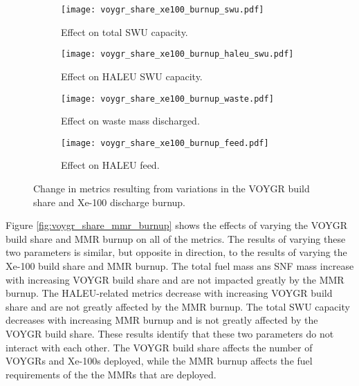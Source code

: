\begin{figure}
    \ContinuedFloat    
    \begin{subfigure}[t]{0.48\textwidth}
        \centering
        \texttt{[image: voygr\_share\_xe100\_burnup\_swu.pdf]}
        \caption{Effect on total SWU capacity.}
        \label{fig:voygr_share_xe100_burnup_swu}
    \end{subfigure}
    \hfill
    \begin{subfigure}[t]{0.48\textwidth}
        \centering
        \texttt{[image: voygr\_share\_xe100\_burnup\_haleu\_swu.pdf]}
        \caption{Effect on HALEU SWU capacity.}
        \label{fig:voygr_share_xe100_burnup_haleu_swu}
    \end{subfigure}
    
    \begin{subfigure}[t]{0.48\textwidth}
        \centering
        \texttt{[image: voygr\_share\_xe100\_burnup\_waste.pdf]}
        \caption{Effect on waste mass discharged.}
        \label{fig:voygr_share_xe100_burnup_waste}
    \end{subfigure}
    \hfill
    \begin{subfigure}[t]{0.48\textwidth}
        \centering
        \texttt{[image: voygr\_share\_xe100\_burnup\_feed.pdf]}
        \caption{Effect on HALEU feed.}
        \label{fig:voygr_share_xe100_burnup_feed}
    \end{subfigure}
    \caption{Change in metrics resulting from variations in the 
    VOYGR build share and Xe-100 discharge burnup.}
    \label{fig:voygr_share_xe100_burnup}
\end{figure}

Figure \ref{fig:voygr_share_mmr_burnup} shows the effects of varying 
the VOYGR build share and \gls{MMR} burnup on all of the metrics. The 
results of varying these two parameters is similar, but opposite in 
direction, to the results of varying the Xe-100 build share and 
\gls{MMR} burnup. The total fuel mass ans \gls{SNF} mass increase 
with increasing VOYGR build share and are not impacted greatly by the 
\gls{MMR} burnup. The \gls{HALEU}-related metrics decrease with 
increasing VOYGR build share and are not greatly affected by the 
\gls{MMR} burnup. The total \gls{SWU} capacity decreases with increasing 
\gls{MMR} burnup and is not greatly affected by the VOYGR build share. 
These results identify that these two parameters do not 
interact with each other. The VOYGR build share affects the number of 
VOYGRs and Xe-100s deployed, while the \gls{MMR} burnup affects the 
fuel requirements of the the \glspl{MMR} that are deployed. 

